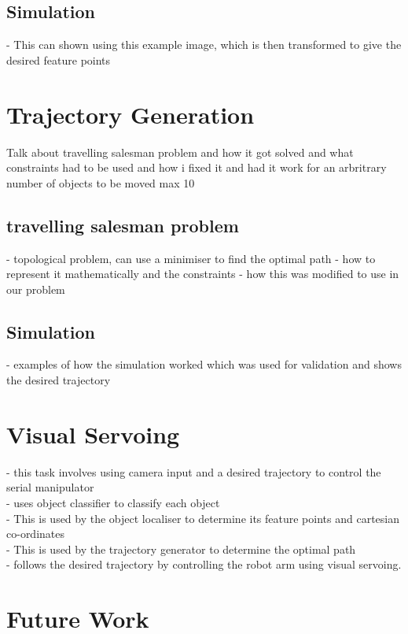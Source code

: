 \documentclass{UoNMCHA}
\numberwithin{equation}{section}
\begin{document}
\subsection{Simulation}
- This can shown using this example image, which is then transformed to give the desired feature points

\newpage
\section{Trajectory Generation}

Talk about travelling salesman problem and how it got solved and what constraints had to be used and how i fixed it and had it work for an arbritrary number of objects to be moved max 10
\subsection{travelling salesman problem}
- topological problem, can use a minimiser to find the optimal path 
- how to represent it mathematically and the constraints 
- how this was modified to use in our problem
\subsection{Simulation}
- examples of how the simulation worked which was used for validation and shows the desired trajectory 


\newpage
\section{Visual Servoing}

- this task involves using camera input and a desired trajectory to control the serial manipulator \\

- uses object classifier to classify each object\\
- This is used by the object localiser to determine its feature points and cartesian co-ordinates \\
- This is used by the trajectory generator to determine the optimal path \\
- follows the desired trajectory by controlling the robot arm using visual servoing. \\

\newpage
\section{Future Work}
\end{document}
